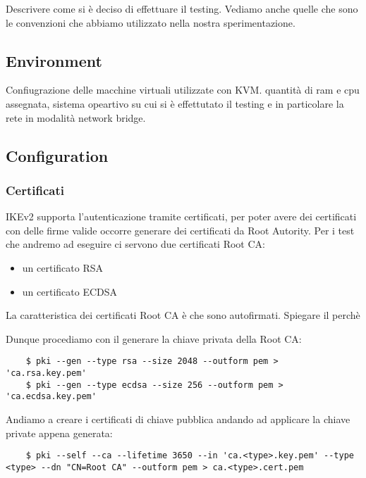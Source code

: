 \documentclass[
10pt, %
a4paper, %
oneside, %
headinclude,footinclude, %
BCOR5mm, %
]{scrartcl}
\begin{document}
Descrivere come si è deciso di effettuare il testing. Vediamo anche quelle che sono le convenzioni che abbiamo utilizzato nella nostra sperimentazione.

\subsection{Environment}

Confiugrazione delle macchine virtuali utilizzate con KVM. quantità di ram e cpu assegnata, sistema opeartivo su cui si è
effettutato il testing e in particolare la rete in modalità network bridge.


\subsection{Configuration} 

    
\subsubsection*{Certificati}

IKEv2 supporta l'autenticazione tramite certificati, per poter avere dei certificati con delle firme valide occorre generare dei certificati da Root Autority.
Per i test che andremo ad eseguire ci servono due certificati Root CA:
\begin{itemize}
    \item un certificato RSA
    \item un certificato ECDSA
\end{itemize}

\noindent
La caratteristica dei certificati Root CA è che sono autofirmati. Spiegare il perchè

Dunque procediamo con il generare la chiave privata della Root CA:
\begin{lstlisting}
    $ pki --gen --type rsa --size 2048 --outform pem > 'ca.rsa.key.pem'
    $ pki --gen --type ecdsa --size 256 --outform pem > 'ca.ecdsa.key.pem'
\end{lstlisting} 

Andiamo a creare i certificati di chiave pubblica andando ad applicare la chiave private appena generata:

\begin{lstlisting}
    $ pki --self --ca --lifetime 3650 --in 'ca.<type>.key.pem' --type <type> --dn "CN=Root CA" --outform pem > ca.<type>.cert.pem
\end{lstlisting}
\end{document}
